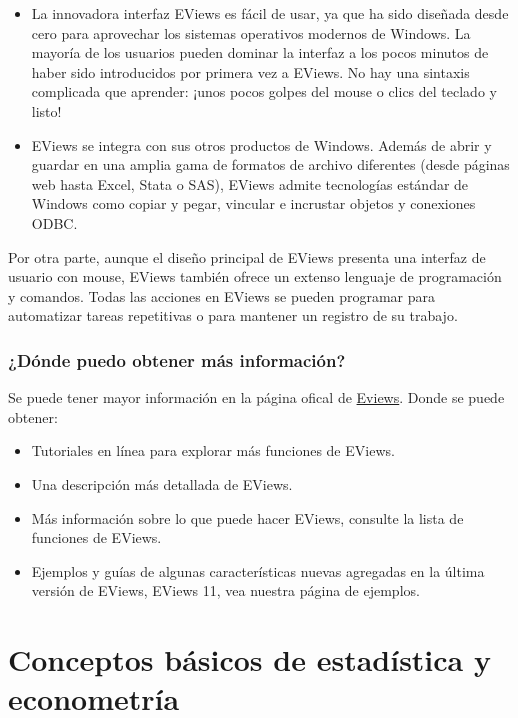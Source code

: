 \documentclass[
]{book}
\providecommand{\tightlist}{%
  \setlength{\itemsep}{0pt}\setlength{\parskip}{0pt}}
\begin{document}
\begin{itemize}
\item
  La innovadora interfaz EViews es fácil de usar, ya que ha sido diseñada desde cero para aprovechar los sistemas operativos modernos de Windows. La mayoría de los usuarios pueden dominar la interfaz a los pocos minutos de haber sido introducidos por primera vez a EViews. No hay una sintaxis complicada que aprender: ¡unos pocos golpes del mouse o clics del teclado y listo!
\item
  EViews se integra con sus otros productos de Windows. Además de abrir y guardar en una amplia gama de formatos de archivo diferentes (desde páginas web hasta Excel, Stata o SAS), EViews admite tecnologías estándar de Windows como copiar y pegar, vincular e incrustar objetos y conexiones ODBC.
\end{itemize}

Por otra parte, aunque el diseño principal de EViews presenta una interfaz de usuario con mouse, EViews también ofrece un extenso lenguaje de programación y comandos. Todas las acciones en EViews se pueden programar para automatizar tareas repetitivas o para mantener un registro de su trabajo.

\hypertarget{duxf3nde-puedo-obtener-muxe1s-informaciuxf3n}{%
\subsection{¿Dónde puedo obtener más información?}\label{duxf3nde-puedo-obtener-muxe1s-informaciuxf3n}}

Se puede tener mayor información en la página ofical de \href{http://www.eviews.com/}{Eviews}. Donde se puede obtener:

\begin{itemize}
\tightlist
\item
  Tutoriales en línea para explorar más funciones de EViews.
\item
  Una descripción más detallada de EViews.
\item
  Más información sobre lo que puede hacer EViews, consulte la lista de funciones de EViews.
\item
  Ejemplos y guías de algunas características nuevas agregadas en la última versión de EViews, EViews 11, vea nuestra página de ejemplos.
\end{itemize}

\hypertarget{conceptos-buxe1sicos-de-estaduxedstica-y-econometruxeda}{%
\chapter{Conceptos básicos de estadística y econometría}\label{conceptos-buxe1sicos-de-estaduxedstica-y-econometruxeda}}
\end{document}
